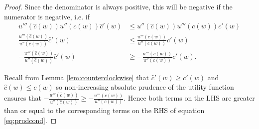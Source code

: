 \documentclass[titlepage]{\econtex}
\begin{document}
\begin{proof}
	Since the denominator is always positive, this will be negative if the 
	numerator is negative, i.e.  if
	\begin{align}
	u'''(\hat{c}(w))u''(c(w))\hat{c}'(w) & \leq  u''(\hat{c}(w))u'''(c(w))c'(w) \nonumber
	\\  \frac{u'''(\hat{c}(w))}{u''(\hat{c}(w))}\hat{c}'(w) & \leq  \frac{u'''(c(w))}{u''(c(w))}c'(w) \nonumber
	\\  -\frac{u'''(\hat{c}(w))}{u''(\hat{c}(w))}\hat{c}'(w) & \geq  -\frac{u'''(c(w))}{u''(c(w))} c'(w) \label{eq:prudcond} .
	\end{align}
	
	Recall from Lemma \ref{lem:counterclockwise} that $\hat{c}'(w) \geq c'(w)$ and $\hat{c}(w) \leq c(w)$ so non-increasing absolute prudence of the utility function ensures that $-\frac{u'''(\hat{c}(w))}{u''(\hat{c}(w))} \geq  -\frac{u'''(c(w))}{u''(c(w))}$. Hence both terms on the LHS are greater than or equal to the corresponding terms on the RHS of equation \eqref{eq:prudcond}. 
	
	
\end{proof}
\end{document}

